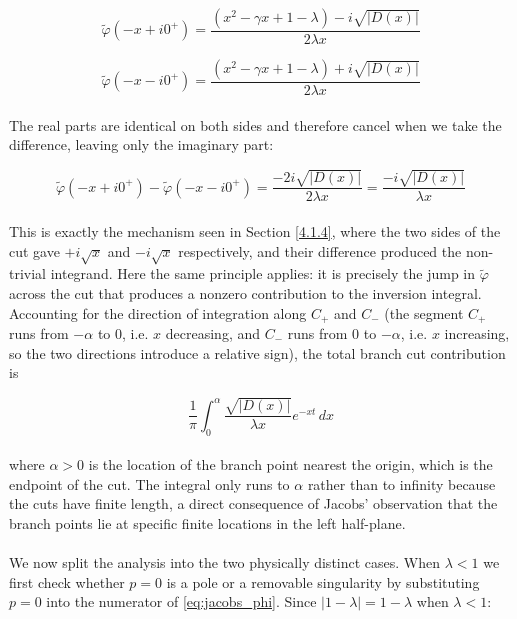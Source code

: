 \begin{equation}
    \tilde{\varphi}(-x+i0^+) = 
    \frac{(x^2 - \gamma x + 1 - \lambda) - i\sqrt{|D(x)|}}{2\lambda x}
\end{equation}

\begin{equation}
    \tilde{\varphi}(-x-i0^+) = 
    \frac{(x^2 - \gamma x + 1 - \lambda) + i\sqrt{|D(x)|}}{2\lambda x}
\end{equation}
\\
The real parts are identical on both sides and therefore cancel when we take 
the difference, leaving only the imaginary part:

\begin{equation}
    \tilde{\varphi}(-x+i0^+) - \tilde{\varphi}(-x-i0^+) = 
    \frac{-2i\sqrt{|D(x)|}}{2\lambda x} = \frac{-i\sqrt{|D(x)|}}{\lambda x}
\end{equation}
\\
This is exactly the mechanism seen in Section \ref{4.1.4}, where the two sides of the 
cut gave $+i\sqrt{x}$ and $-i\sqrt{x}$ respectively, and their difference 
produced the non-trivial integrand. Here the same principle applies: it is 
precisely the jump in $\tilde{\varphi}$ across the cut that produces a nonzero 
contribution to the inversion integral. Accounting for the direction of integration 
along $C_+$ and $C_-$ (the segment $C_+$ runs from $-\alpha$ to $0$, i.e. $x$ 
decreasing, and $C_-$ runs from $0$ to $-\alpha$, i.e. $x$ increasing, so the 
two directions introduce a relative sign), the total branch cut contribution is

\begin{equation}
    \frac{1}{\pi}\int_0^{\alpha} \frac{\sqrt{|D(x)|}}{\lambda x} e^{-xt}\, dx
    \label{eq:branchcutintegral}
\end{equation}
\\
where $\alpha > 0$ is the location of the branch point nearest the origin, which 
is the endpoint of the cut. The integral only runs to $\alpha$ rather than to 
infinity because the cuts have finite length, a direct consequence of Jacobs' 
observation that the branch points lie at specific finite locations in the 
left half-plane.
\\
\\
We now split the analysis into the two physically distinct cases. When 
$\lambda < 1$ we first check whether $p = 0$ is a pole or a removable 
singularity by substituting $p = 0$ into the numerator of \eqref{eq:jacobs_phi}. 
Since $|1-\lambda| = 1-\lambda$ when $\lambda < 1$:

